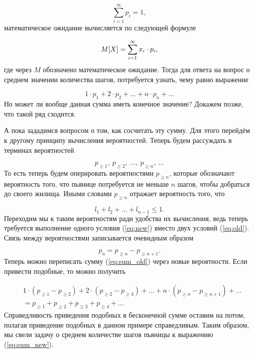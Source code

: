\documentclass[12pt]{article}
\begin{document}
\begin{equation} \label{eq:norm_old}
	\sum_{i=1}^\infty{p_i} = 1,
\end{equation}
математическое ожидание вычисляется по следующей формуле 

\begin{equation}
	M\qty[X] = \sum_{i=1}^\infty{x_i \cdot p_i}, 
\end{equation}
где через $M$ обозначено математическое ожидание. Тогда для ответа на вопрос о среднем значении количества шагов, потребуется узнать, чему равно выражение 

\begin{equation} \label{eq:sum_old}
	1\cdot p_1 + 2\cdot p_2 + \ldots + n\cdot p_n + \ldots
\end{equation}
Но может ли вообще данная сумма иметь конечное значение? Докажем позже, что такой ряд сходится. 

\par А пока зададимся вопросом о том, как сосчитать эту сумму. Для этого перейдём к другому принципу вычисления вероятностей. Теперь будем рассуждать в терминах вероятностей 

\begin{equation}
	p_{\ge1},\ p_{\ge2},\ \ldots,\ p_{\ge n},\ \ldots
\end{equation}
То есть теперь будем оперировать вероятностями $p_{\ge n}$, которые обозначают вероятность того, что пьянице потребуется не меньше $n$ шагов, чтобы добраться до своего жилища. Иными словами $p_{\ge n}$ отражает вероятность того, что 

\begin{equation} 
	l_1 + l_2 + \ldots + l_{n-1} \le 1.\label{eq:new}
\end{equation}
Переходим мы к таким вероятностям ради удобства их вычисления, ведь теперь требуется выполнение одного условия (\ref{eq:new}) вместо двух условий (\ref{eq:old}). Связь между вероятностями записывается очевидным образом

\begin{equation}
	p_n = p_{\ge n} - p_{\ge n+1}.
\end{equation}
Теперь можно переписать сумму (\ref{eq:sum_old}) через новые вероятности. Если привести подобные, то можно получить

\begin{equation} \label{eq:sum_new}
\begin{split}
	&1\cdot (p_{\ge 1} - p_{\ge 2}) + 2\cdot (p_{\ge 2} - p_{\ge 3}) + \ldots + n\cdot (p_{\ge n} - p_{\ge n+1}) + \ldots \\
	& = p_{\ge 1} + p_{\ge 2} + p_{\ge 3} + p_{\ge 4} + \ldots
\end{split}
\end{equation}
Справедливость приведения подобных в бесконечной сумме оставим на потом, полагая приведение подобных в данном примере справедливым. Таким образом, мы свели задачу о среднем количестве шагов пьяницы к выражению (\ref{eq:sum_new}).
\end{document}
